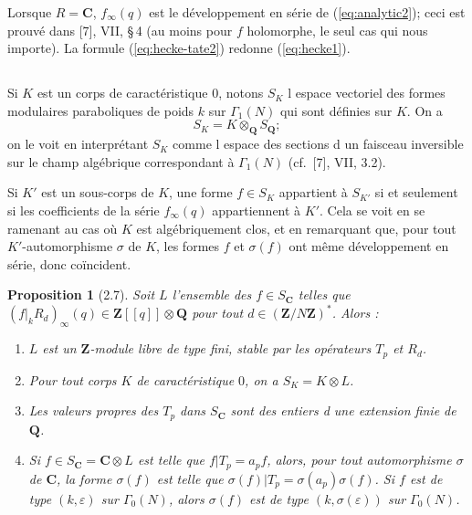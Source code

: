 \documentclass[11pt]{amsart}
\theoremstyle{plain}
\newtheorem{proposition}[theoreme]{Proposition}
\theoremstyle{definition}
\theoremstyle{remark}
\newcommand{\Q}{\mathbf{Q}}
\newcommand{\Z}{\mathbf{Z}}
\newcommand{\C}{\mathbf{C}}
\begin{document}
Lorsque $R = \C$, $f_{\infty}(q)$ est le développement en série de (\ref{eq:analytic2}); ceci est prouvé dans [7], VII, \S\,4 (au moins pour $f$ holomorphe, le seul cas qui nous importe). La formule (\ref{eq:hecke-tate2}) redonne (\ref{eq:hecke1}).

\subsection{}

Si $K$ est un corps de caractéristique $0$, notons $S_K$ l espace vectoriel des formes modulaires paraboliques de poids $k$ sur $\Gamma_1(N)$ qui sont définies sur $K$. On a
\begin{equation}
\label{eq:basechange}
S_K = K \otimes_\Q S_\Q;
\end{equation}
on le voit en interprétant $S_K$ comme l espace des sections d un faisceau inversible sur le champ algébrique correspondant à $\Gamma_1(N)$ (cf.~[7], VII, 3.2).

Si $K'$ est un sous-corps de $K$, une forme $f \in S_K$ appartient à $S_{K'}$ si et seulement si les coefficients de la série $f_{\infty}(q)$ appartiennent à $K'$. Cela se voit en se ramenant au cas où $K$ est algébriquement clos, et en remarquant que, pour tout $K'$-automorphisme $\sigma$ de $K$, les formes $f$ et $\sigma(f)$ ont même développement en série, donc coïncident.

\begin{proposition}[2.7]
Soit $L$ l'ensemble des $f \in S_\C$ telles que $(f|_k R_d)_{\infty}(q) \in \Z[[q]] \otimes \Q$ pour tout $d \in (\Z/N\Z)^*$. Alors :
\begin{enumerate}
\item[(2.7.1)] $L$ est un $\Z$-module libre de type fini, stable par les opérateurs $T_p$ et $R_d$.
\item[(2.7.2)] Pour tout corps $K$ de caractéristique $0$, on a $S_K = K \otimes L$.
\item[(2.7.3)] Les valeurs propres des $T_p$ dans $S_\C$ sont des entiers d une extension finie de $\Q$.
\item[(2.7.4)] Si $f \in S_\C = \C \otimes L$ est telle que $f|T_p = a_p f$, alors, pour tout automorphisme $\sigma$ de $\C$, la forme $\sigma(f)$ est telle que $\sigma(f)|T_p = \sigma(a_p) \sigma(f)$. Si $f$ est de type $(k, \varepsilon)$ sur $\Gamma_0(N)$, alors $\sigma(f)$ est de type $(k, \sigma(\varepsilon))$ sur $\Gamma_0(N)$.
\end{enumerate}
\end{proposition}
\end{document}
